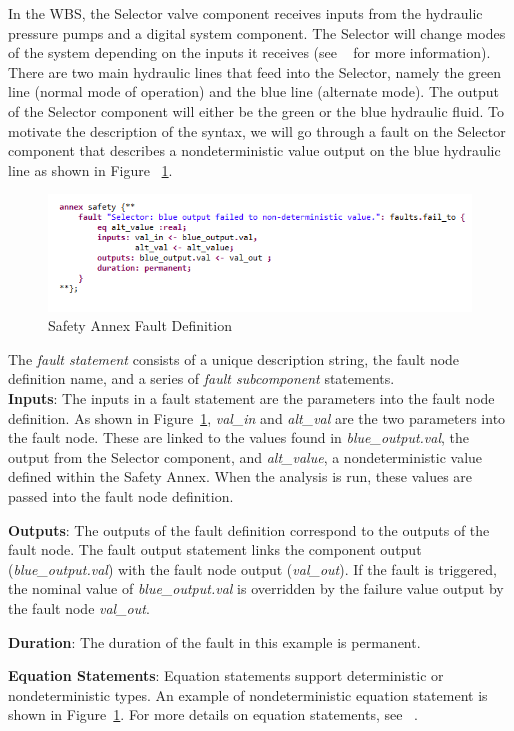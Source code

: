 In the WBS, the Selector valve component receives inputs from the hydraulic pressure pumps and a digital system component. The Selector will change modes of the system depending on the inputs it receives (see ~\cite{AIR6110,Stewart17:IMBSA} for more information). There are two main hydraulic lines that feed into the Selector, namely the green line (normal mode of operation) and the blue line (alternate mode). The output of the Selector component will either be the green or the blue hydraulic fluid. To motivate the description of the syntax, we will go through a fault on the Selector component that describes a nondeterministic value output on the blue hydraulic line as shown in Figure ~\ref{fig:annex}. \\

\begin{figure}
\begin{center}
\includegraphics[width=1.0\textwidth]{images/annex.png}
\end{center}
\vspace{-0.2in}
\caption{Safety Annex Fault Definition}
\label{fig:annex}
\end{figure}

The \textit{fault statement} consists of a unique description string, the fault node definition name, and a series of \textit{fault subcomponent} statements. \\

\textbf{Inputs}: The inputs in a fault statement are the parameters into the fault node definition. As shown in Figure~\ref{fig:annex}, \textit{val\_in} and \textit{alt\_val} are the two parameters into the fault node. These are linked to the values found in \textit{blue\_output.val}, the output from the Selector component, and \textit{alt\_value}, a nondeterministic value defined within the Safety Annex. When the analysis is run, these values are passed into the fault node definition. 

\textbf{Outputs}: The outputs of the fault definition correspond to the outputs of the fault node. The fault output statement links the component output (\textit{blue\_output.val}) with the fault node output (\textit{val\_out}). If the fault is triggered, the nominal value of \textit{blue\_output.val} is overridden by the failure value output by the fault node \textit{val\_out}.

\textbf{Duration}: The duration of the fault in this example is permanent. 

\textbf{Equation Statements}: Equation statements support deterministic or nondeterministic types. An example of nondeterministic equation statement is shown in Figure~\ref{fig:annex}. For more details on equation statements, see ~\cite{NFM2012:CoGaMiWhLaLu}.\\





